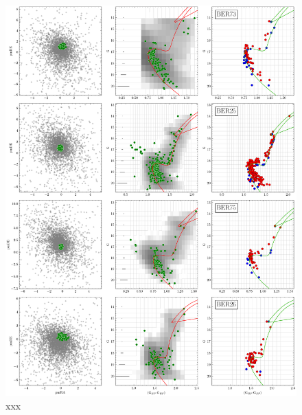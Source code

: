 \documentclass[referee]{aa}
\begin{document}
\begin{appendix}
 \begin{figure}[t]
  \centering
  \includegraphics[height=.95\textheight]{figs/0_fpars.png}
  \caption{xxx}
  \label{fig:0fpars}
 \end{figure}


\end{appendix}
\end{document}
